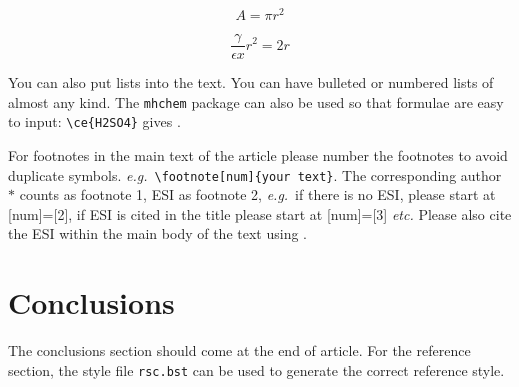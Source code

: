 \documentclass[twoside,twocolumn,9pt]{article}
\begin{document}
 \[ A = \pi r^2 \]

\begin{equation}
  \frac{\gamma}{\epsilon x} r^2 = 2r
\end{equation}

You can also put lists into the text. You can have bulleted or numbered lists of almost any kind. 
The \texttt{mhchem} package can also be used so that formulae are easy to input: \texttt{\textbackslash ce\{H2SO4\}} gives . 

For footnotes in the main text of the article please number the footnotes to avoid duplicate symbols. \textit{e.g.}\ \texttt{\textbackslash footnote[num]\{your text\}}. The corresponding author $\ast$ counts as footnote 1, ESI as footnote 2, \textit{e.g.}\ if there is no ESI, please start at [num]=[2], if ESI is cited in the title please start at [num]=[3] \textit{etc.} Please also cite the ESI within the main body of the text using \dag.

\section{Conclusions}
The conclusions section should come at the end of article. For the reference section, the style file \texttt{rsc.bst} can be used to generate the correct reference style.


\balance


\end{document}
